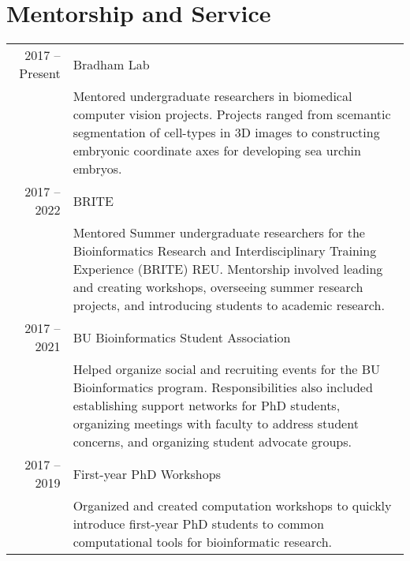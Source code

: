 \documentclass[a4paper,10pt]{article}
\begin{document}
\section{\color{linkcolour} Mentorship and Service}
\begin{tabular}{rp{10cm}}
	2017 -- Present
	 & Bradham Lab                                                                                                                                              \\
	 & \footnotesize{Mentored undergraduate researchers in biomedical computer vision projects. Projects ranged from scemantic segmentation of cell-types in 3D
		images to constructing embryonic coordinate axes for developing
	sea urchin embryos.}                                                                                                                                        \\
	2017 -- 2022
	 & BRITE                                                                                                                                                    \\
	 & \footnotesize{Mentored Summer undergraduate researchers for the
		Bioinformatics Research and Interdisciplinary Training Experience (BRITE)
		REU. Mentorship involved leading and creating workshops, overseeing
	summer research projects, and introducing students to academic research.}                                                                                   \\
	2017 -- 2021
	 & BU Bioinformatics Student Association                                                                                                                    \\
	 & \footnotesize{Helped organize social and recruiting events for the BU
		Bioinformatics program. Responsibilities also included establishing
		support networks for PhD students, organizing meetings with faculty to
	address student concerns, and organizing student advocate groups.}                                                                                          \\
	2017 -- 2019
	 & First-year PhD Workshops                                                                                                                                 \\
	 & \footnotesize{Organized and created computation workshops to quickly
		introduce first-year PhD students to common computational
	tools for bioinformatic research.}                                                                                                                          \\

\end{tabular}
\end{document}
